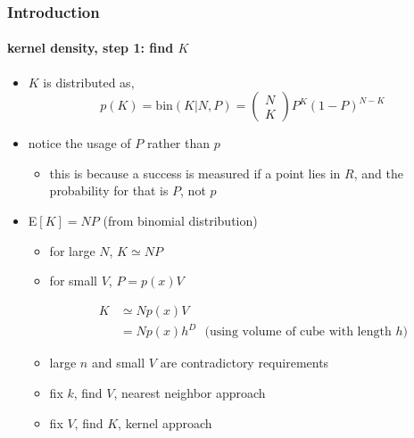 \begin{frame}
\frametitle{Introduction}
\framesubtitle{kernel density, step 1: find $K$}
\logoCSIPCPL\mypagenum
	\begin{itemize}
 		\item $K$ is distributed as,
			\begin{equation*}
				p(K) = \text{bin}(K|N,P) =
				\left(
					\begin{array}{c}
						 N \\ K	
					\end{array}
				\right)
				P^K(1-P)^{N-K}
			\end{equation*}
			\item notice the usage of $P$ rather than $p$
				\begin{itemize}
					\item this is because a success is measured if a point lies in $R$, and the probability for that is $P$, not $p$
				\end{itemize}
		\item E$[K] = NP$ (from binomial distribution)
		\begin{itemize}
			\item for large $N$, $K \simeq NP$
			\item for small $V$, $P=p(x)V$ 
				\begin{block}{}
					\begin{align*} 
						K &\simeq Np(x)V\\
						&= Np(x)h^D \ \ \ \text{(using volume of cube with length $h$)}
					\end{align*}
				\end{block}
			\item large $n$ and small $V$ are contradictory requirements
			\item fix $k$, find $V$, {\color{red}nearest neighbor approach}
			\item fix $V$, find $K$, {\color{red}kernel approach}
		\end{itemize}
	\end{itemize}
\end{frame}



